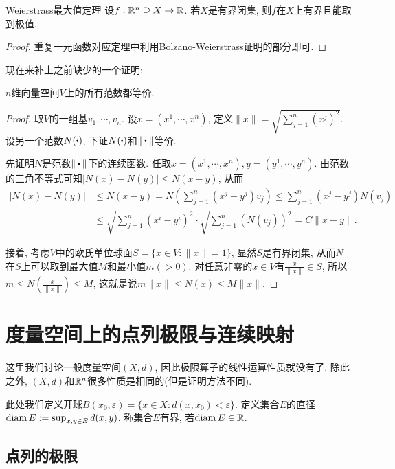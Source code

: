 \begin{theorem}{Weierstrass最大值定理}
	设$f:\mathbb{R} ^n \supseteq X \to \mathbb{R}$. 若$X$是有界闭集, 则$f$在$X$上有界且能取到极值. 
\end{theorem}
\begin{proof}
	重复一元函数对应定理中利用Bolzano-Weierstrass证明的部分即可. 
\end{proof}

现在来补上之前缺少的一个证明: 

\begin{proposition}{}
	$n$维向量空间$V$上的所有范数都等价. 
\end{proposition}
\begin{proof}
	取$V$的一组基$v_1,\cdots ,v_n$. 设$x=(x^1,\cdots ,x^n)$, 定义$\| x \| = \sqrt{\sum_{j=1}^{n} (x^j)^2}$. 设另一个范数$N(\bigcdot )$, 下证$N(\bigcdot )$和$\| \bigcdot \|$等价. 
	
	先证明$N$是范数$\| \bigcdot \|$下的连续函数. 任取$x=(x^1,\cdots ,x^n),y=(y^1,\cdots ,y^n)$. 由范数的三角不等式可知$|N(x)-N(y)| \leq N(x-y)$, 从而
	\begin{align*}
		|N(x)-N(y)| &\leq N(x-y) = N\left( \sum_{j=1}^{n} (x^j-y^j)v_j \right) \leq \sum_{j=1}^{n} (x^j-y^j)N(v_j) \\
		&\leq \sqrt{\sum_{j=1}^{n} (x^i-y^i)^2} \cdot \sqrt{\sum_{j=1}^{n} (N(v_j))^2} = C\| x-y \|. 
	\end{align*}
	
	接着, 考虑$V$中的欧氏单位球面$S=\{ x \in V:\| x \|=1 \}$, 显然$S$是有界闭集, 从而$N$在$S$上可以取到最大值$M$和最小值$m(>0)$. 对任意非零的$x \in V$有$\frac{x}{\| x \|} \in S$, 所以$m \leq N(\frac{x}{\| x \|}) \leq M$, 这就是说$m\| x \| \leq N(x) \leq M\| x \|$. 
\end{proof}


\newpage
\section{度量空间上的点列极限与连续映射}

这里我们讨论一般度量空间$(X,d)$, 因此极限算子的线性运算性质就没有了. 除此之外, $(X,d)$和$\mathbb{R} ^n$很多性质是相同的(但是证明方法不同). 

此处我们定义开球$B(x_0,\varepsilon) = \{ x\in X:d(x,x_0)<\varepsilon \}$. 定义集合$E$的直径$\operatorname{diam} E := \sup_{x,y \in E}d(x,y)$. 称集合$E$有界, 若$\operatorname{diam} E \in \mathbb{R}$. 

\subsection{点列的极限}

